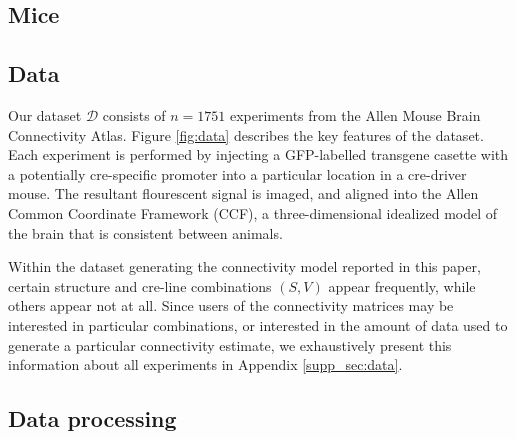 \subsection{Mice}


\subsection{Data}

Our dataset $\mathcal D$ consists of $n=1751$ experiments from the Allen Mouse Brain Connectivity Atlas.
Figure \ref{fig:data} describes the key features of the dataset.
Each experiment is performed by injecting a GFP-labelled transgene casette with a potentially cre-specific promoter into a particular location in a cre-driver mouse.
The resultant flourescent signal is imaged, and aligned into the Allen Common Coordinate Framework (CCF), a three-dimensional idealized model of the brain that is consistent between animals.

Within the dataset generating the connectivity model reported in this paper, certain structure and cre-line combinations $(S,V)$ appear frequently, while others appear not at all.
Since users of the connectivity matrices may be interested in particular combinations, or interested in the amount of data used to generate a particular connectivity estimate, we exhaustively present this information about all experiments in Appendix \ref*{supp_sec:data}.

\subsection{Data processing}
\label{sec:data_pre}

